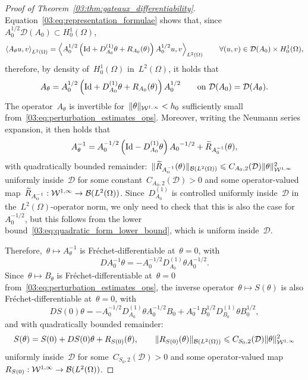 \begin{proof}[Proof of Theorem~\ref{03:thm:gateaux_differentiability}]
    Equation~\eqref{03:eq:representation_formulae} shows that, since~$A_0^{1/2} \mathcal D(A_0)\subset H_0^1(\Omega)$,
    \begin{equation}
        \left\langle A_\theta u,v \right\rangle_{L^2(\Omega)} = \left\langle  A_0^{1/2}\left(\mathrm{Id} + D_{A_0}^{(1)}\theta+R_{A_0}(\theta)\right)A_0^{1/2} u,v \right\rangle_{L^2(\Omega)}\qquad \forall (u,v)\in \mathcal D(A_0)\times H_0^1(\Omega),
    \end{equation}
    therefore, by density of~$H_0^1(\Omega)$ in~$L^2(\Omega)$, it holds that
    \begin{equation}
        A_\theta = A_0^{1/2}\left(\mathrm{Id} + D_{A_0}^{(1)}\theta+R_{A_0}(\theta)\right)A_0^{1/2}\qquad\text{on $\mathcal D(A_0)=\mathcal D(A_\theta)$}.
    \end{equation}
    The operator~$A_\theta$ is invertible for~$\|\theta\|_{{\mathcal{W}}^{1,\infty}} < h_0$ sufficiently small from~\eqref{03:eq:perturbation_estimates_ops}.
    Moreover, writing the Neumann series expansion, it then holds that
    \begin{equation}
        A_\theta^{-1} = A_0^{-1/2}\left(\mathrm{Id}-D_{A_0}^{(1)}\theta\right){A_0}^{-1/2} + \widetilde{R}_{A_0^{-1}}(\theta),
    \end{equation}
    with quadratically bounded remainder:~$\|\widetilde{R}_{A_{0}^{-1}}(\theta)\|_{\mathcal B(L^2(\Omega))} \leqslant C_{A_0,2}(\mathcal D) \|\theta\|_{{\mathcal{W}}^{1,\infty}}^2$ uniformly inside~$\mathcal D$ for some constant~$C_{A_0,2}(\mathcal D)>0$ and some operator-valued map~$\widetilde{R}_{A_0^{-1}}:{\mathcal{W}}^{1,\infty}\to\mathcal B(L^2(\Omega))$.
    Since~$D_{A_0}^{(1)}$ is controlled uniformly inside~$\mathcal D$ in the~$L^2(\Omega)$-operator norm, we only need to check that this is also the case for~$A_0^{-1/2}$, but this follows from the lower bound~\eqref{03:eq:quadratic_form_lower_bound}, which is uniform inside~$\mathcal D$.

    Therefore,~$\theta\mapsto A_\theta^{-1}$ is Fréchet-differentiable at~$\theta=0$, with
    \[D A_0^{-1}\theta = - A_0^{-1/2}D_{A_0}^{(1)}\theta A_0^{-1/2}.\]
    Since~$\theta\mapsto B_\theta$ is Fréchet-differentiable at~$\theta=0$ from~\eqref{03:eq:perturbation_estimates_ops}, the inverse operator~$\theta\mapsto S(\theta)$ is also Fréchet-differentiable at~$\theta=0$, with
    \begin{equation}
        \label{03:eq:derivative_solution_operator}
        D S(0)\theta = -A_0^{-1/2}D_{A_0}^{(1)}\theta A_0^{-1/2}B_0 + A_0^{-1}B_0^{1/2}D_{B_0}^{(1)}\theta B_0^{1/2},
    \end{equation}
    and with quadratically bounded remainder:
    \begin{equation}
        \label{03:eq:solution_expansion}
        S(\theta) = S(0) + D S(0)\theta + R_{S(0)}(\theta),\qquad \|R_{S(0)}(\theta)\|_{\mathcal B(L^2(\Omega))} \leqslant C_{S_0,2}(\mathcal D)\|\theta\|^2_{{\mathcal{W}}^{1,\infty}}
    \end{equation}
    uniformly inside~$\mathcal D$ for some~$C_{S_0,2}(\mathcal D)>0$ and some operator-valued map~$R_{S(0)}:{\mathcal{W}}^{1,\infty}\to\mathcal B(L^2(\Omega))$.


\end{proof}
